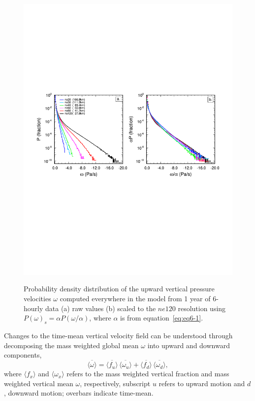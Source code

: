\begin{figure}[t]
\begin{center}
\noindent\includegraphics[width=33pc,angle=0]{chapter6/temp_2pdf.pdf}\\
\end{center}
\caption{Probability density distribution of the upward vertical pressure velocities $\omega$ computed everywhere in the model from 1 year of 6-hourly data (a) raw values (b) scaled to the $ne120$ resolution using $P(\omega)_s = \alpha P (\omega / \alpha)$, where $\alpha$ is from equation~\ref{eq:eq6-1}.}
\label{fig:2pdf}
\end{figure}

Changes to the time-mean vertical velocity field can be understood through decomposing the mass weighted global mean $\omega$ into upward and downward components,
\begin{equation}
\overline{\langle \omega \rangle} = \overline{\langle f_{u} \rangle} \, \overline{\langle \omega_{u} \rangle} + \overline{\langle f_{d} \rangle} \, \overline{\langle \omega_{d} \rangle}, \label{eq:eq6-2}
\end{equation}
where $\langle f_x \rangle$ and $\langle \omega_x \rangle$ refers to the mass weighted vertical fraction and mass weighted vertical mean $\omega$, respectively, subscript $u$ refers to upward motion and $d$, downward motion; overbars indicate time-mean.


